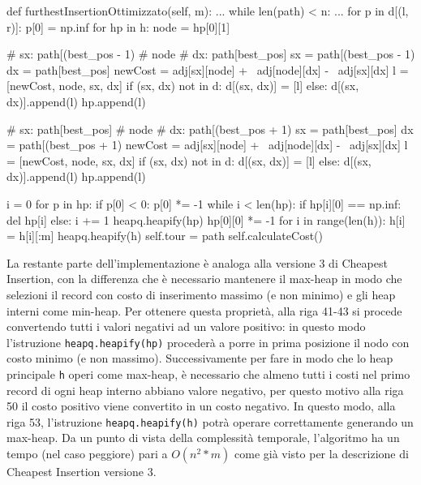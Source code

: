 \documentclass[a4paper,12pt]{report}
\begin{document}
\begin{python}
def furthestInsertionOttimizzato(self, m):
  ...
  while len(path) < n:
    ...
    for p in d[(l, r)]:
      p[0] = np.inf
    for hp in h:
      node = hp[0][1]

      # sx: path[(best_pos - 1) %
      # node
      # dx: path[best_pos]
      sx = path[(best_pos - 1) %
      dx = path[best_pos]
      newCost = adj[sx][node] + \
                adj[node][dx] - \
                adj[sx][dx]
      l = [newCost, node, sx, dx]
      if (sx, dx) not in d:
        d[(sx, dx)] = [l]
      else:
        d[(sx, dx)].append(l)
      hp.append(l)

      # sx: path[best_pos]
      # node
      # dx: path[(best_pos + 1) %
      sx = path[best_pos]
      dx = path[(best_pos + 1) %
      newCost = adj[sx][node] + \
                adj[node][dx] - \
                adj[sx][dx]
      l = [newCost, node, sx, dx]
      if (sx, dx) not in d:
        d[(sx, dx)] = [l]
      else:
        d[(sx, dx)].append(l)
      hp.append(l)

      i = 0
      for p in hp:
        if p[0] < 0:
          p[0] *= -1
      while i < len(hp):
        if hp[i][0] == np.inf:
          del hp[i]
        else:
          i += 1
      heapq.heapify(hp)
      hp[0][0] *= -1
    for i in range(len(h)):
      h[i] = h[i][:m]
    heapq.heapify(h)
  self.tour = path
  self.calculateCost()
\end{python}
La restante parte dell'implementazione è analoga alla versione 3 di Cheapest Insertion, con la differenza che è necessario mantenere il max-heap in modo che selezioni il record con costo di inserimento massimo (e non minimo) e gli heap interni come min-heap. Per ottenere questa proprietà, alla riga 41-43 si procede convertendo tutti  i valori negativi ad un valore positivo: in questo modo l'istruzione \lstinline!heapq.heapify(hp)! procederà a porre in prima posizione il nodo con costo minimo (e non massimo). Successivamente per fare in modo che lo heap principale \lstinline!h! operi come max-heap, è necessario che almeno tutti i costi nel primo record di ogni heap interno abbiano valore negativo, per questo motivo alla riga 50 il costo positivo viene convertito in un costo negativo. In questo modo, alla riga 53, l'istruzione \lstinline!heapq.heapify(h)! potrà operare correttamente generando un max-heap. \newline
Da un punto di vista della complessità temporale, l'algoritmo ha un tempo (nel caso peggiore) pari a $O(n^2 * m)$ come già visto per la descrizione di Cheapest Insertion versione 3.
\end{document}
